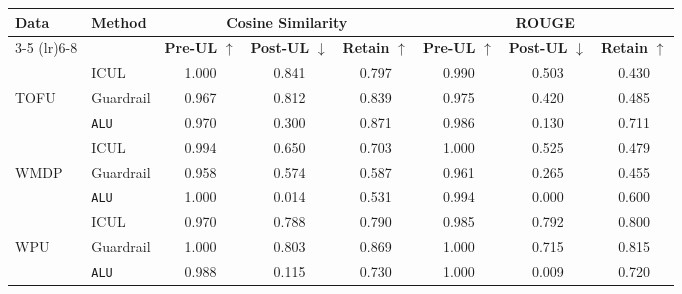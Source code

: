 \begin{table*}[]
    \centering
    \caption{Comparison of Methods using Cosine Similarity and ROUGE Metrics with phi-3-mini-128k}
    \begin{tabular}{llccc|ccc}
        \toprule
        \textbf{Data}&\textbf{Method} & \multicolumn{3}{c}{\textbf{Cosine Similarity}} & \multicolumn{3}{c}{\textbf{ROUGE}} \\
        \cmidrule(lr){3-5} \cmidrule(lr){6-8}
         & & \textbf{Pre-UL} $\uparrow$ & \textbf{Post-UL} $\downarrow$ & \textbf{Retain} $\uparrow$ & \textbf{Pre-UL} $\uparrow$ & \textbf{Post-UL} $\downarrow$ & \textbf{Retain} $\uparrow$ \\
        \midrule
        &ICUL & 1.000 & 0.841 & 0.797 & 0.990 & 0.503 & 0.430 \\
        TOFU &Guardrail & 0.967 & 0.812 & 0.839 & 0.975 & 0.420 & 0.485 \\
        &\texttt{ALU}  & 0.970 & 0.300 & 0.871 & 0.986 & 0.130 & 0.711 \\
        \midrule
        &ICUL  & 0.994 & 0.650 & 0.703 & 1.000 & 0.525 & 0.479 \\
        WMDP & Guardrail  & 0.958  & 0.574 & 0.587 & 0.961 & 0.265 & 0.455 \\
        &\texttt{ALU} & 1.000  & 0.014 & 0.531 & 0.994 & 0.000 & 0.600 \\
        \midrule
        &ICUL  & 0.970 & 0.788 & 0.790 & 0.985 & 0.792 & 0.800 \\
        WPU &Guardrail & 1.000 & 0.803 & 0.869 & 1.000 & 0.715 & 0.815 \\
        &\texttt{ALU} & 0.988 & 0.115 & 0.730 & 1.000 & 0.009 & 0.720 \\
        
        \bottomrule
    \end{tabular}
\label{tab:t16}    
\end{table*}

